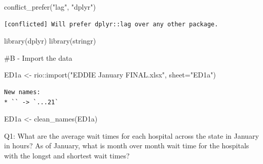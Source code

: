 \documentclass[
  letterpaper,
  DIV=11,
  numbers=noendperiod]{scrartcl}
\newenvironment{Shaded}{\begin{snugshade}}{\end{snugshade}}
\newcommand{\AttributeTok}[1]{\textcolor[rgb]{0.40,0.45,0.13}{#1}}
\newcommand{\CommentTok}[1]{\textcolor[rgb]{0.37,0.37,0.37}{#1}}
\newcommand{\FunctionTok}[1]{\textcolor[rgb]{0.28,0.35,0.67}{#1}}
\newcommand{\NormalTok}[1]{\textcolor[rgb]{0.00,0.23,0.31}{#1}}
\newcommand{\OtherTok}[1]{\textcolor[rgb]{0.00,0.23,0.31}{#1}}
\newcommand{\SpecialCharTok}[1]{\textcolor[rgb]{0.37,0.37,0.37}{#1}}
\newcommand{\StringTok}[1]{\textcolor[rgb]{0.13,0.47,0.30}{#1}}
\begin{document}
\begin{Shaded}
\begin{Highlighting}[]
\FunctionTok{conflict\_prefer}\NormalTok{(}\StringTok{"lag"}\NormalTok{, }\StringTok{"dplyr"}\NormalTok{)}
\end{Highlighting}
\end{Shaded}

\begin{verbatim}
[conflicted] Will prefer dplyr::lag over any other package.
\end{verbatim}

\begin{Shaded}
\begin{Highlighting}[]
\FunctionTok{library}\NormalTok{(dplyr)}
\FunctionTok{library}\NormalTok{(stringr)}
\end{Highlighting}
\end{Shaded}

\begin{Shaded}
\begin{Highlighting}[]
\CommentTok{\#B {-} Import the data}

\NormalTok{ED1a }\OtherTok{\textless{}{-}}\NormalTok{ rio}\SpecialCharTok{::}\FunctionTok{import}\NormalTok{(}\StringTok{"EDDIE January FINAL.xlsx"}\NormalTok{, }\AttributeTok{sheet=}\StringTok{"ED1a"}\NormalTok{)}
\end{Highlighting}
\end{Shaded}

\begin{verbatim}
New names:
* `` -> `...21`
\end{verbatim}

\begin{Shaded}
\begin{Highlighting}[]
\NormalTok{ED1a }\OtherTok{\textless{}{-}} \FunctionTok{clean\_names}\NormalTok{(ED1a)}
\end{Highlighting}
\end{Shaded}

Q1: What are the average wait times for each hospital across the state
in January in hours? As of January, what is month over month wait time
for the hospitals with the longst and shortest wait times?
\end{document}
